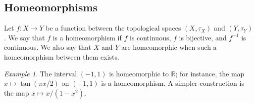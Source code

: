 \documentclass[11pt]{article}
\newcommand{\R}{\mathbb{R}}
\theoremstyle{definition}
\theoremstyle{remark}
\newtheorem*{example}{Example}
\numberwithin{equation}{section}
\begin{document}
    \subsection{Homeomorphisms}

    \begin{definition}
        Let $f\colon X \to Y$ be a function between the topological spaces $(X,
        \tau_X)$ and $(Y, \tau_Y)$. We say that $f$ is a homeomorphism if $f$ is
        continuous, $f$ is bijective, and $f^{-1}$ is continuous. We also say that
        $X$ and $Y$ are homeomorphic when such a homeomorphism between them exists.
    \end{definition}
    \begin{example}
        The interval $(-1, 1)$ is homeomorphic to $\R$; for instance, the map $x
        \mapsto \tan(\pi x/ 2)$ on $(-1, 1)$ is a homeomorphism. A simpler
        construction is the map $x \mapsto x / (1 - x^2)$.
    \end{example}
\end{document}
